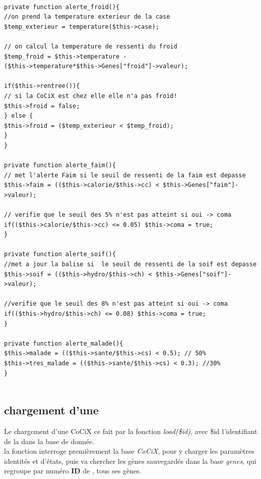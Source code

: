 \documentclass[french]{report}
\begin{document}
\begin{lstlisting}[caption={Fonctions d'alertes}]

private function alerte_froid(){
//on prend la temperature exterieur de la case
$temp_exterieur = temperature($this->case);

// on calcul la temperature de ressenti du froid
$temp_froid = $this->temperature - 
($this->temperature*$this->Genes["froid"]->valeur);

if($this->rentree()){
// si la CoCiX est chez elle elle n'a pas froid!
$this->froid = false;
} else {
$this->froid = ($temp_exterieur < $temp_froid);
}
}

private function alerte_faim(){
// met l'alerte Faim si le seuil de ressenti de la faim est depasse
$this->faim = (($this->calorie/$this->cc) < $this->Genes["faim"]->valeur);

// verifie que le seuil des 5% n'est pas atteint si oui -> coma
if(($this->calorie/$this->cc) <= 0.05) $this->coma = true;
}

private function alerte_soif(){
//met a jour la balise si  le seuil de ressenti de la soif est depasse
$this->soif = (($this->hydro/$this->ch) < $this->Genes["soif"]->valeur);

//verifie que le seuil des 8% n'est pas atteint si oui -> coma
if(($this->hydro/$this->ch) <= 0.08) $this->coma = true;
}

private function alerte_malade(){
$this->malade = (($this->sante/$this->cs) < 0.5); // 50%
$this->tres_malade = (($this->sante/$this->cs) < 0.3); //30%	
}


\end{lstlisting}
\subsection{chargement d'une \CoCiX}
Le chargement d'une CoCiX ce fait par la fonction \textit{load(\$id)}, avec \$id l'identifiant de la \CoCiX dans la base de donnée.\\
la fonction interroge premièrement la base \textit{CoCiX}, pour y charger les paramètres identités et d'états, puis va chercher les gènes sauvegardés dans la base \textit{genes}, qui regroupe par numéro \textbf{ID} de \CoCiX, tous ses gènes.\\
\end{document}
